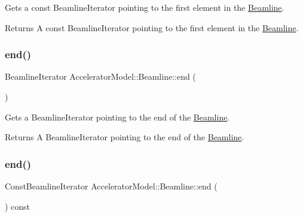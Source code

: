 Gets a const Beamline\+Iterator pointing to the first element in the \hyperlink{classAcceleratorModel_1_1Beamline}{Beamline}. \begin{DoxyReturn}{Returns}
A const Beamline\+Iterator pointing to the first element in the \hyperlink{classAcceleratorModel_1_1Beamline}{Beamline}. 
\end{DoxyReturn}
\mbox{\label{classAcceleratorModel_1_1Beamline_a190fe2e2aeca28999af7b07beea84d60}} 
\subsubsection{\texorpdfstring{end()}{end()}\hspace{0.1cm}{\footnotesize\ttfamily [1/2]}}
{\footnotesize\ttfamily Beamline\+Iterator Accelerator\+Model\+::\+Beamline\+::end (\begin{DoxyParamCaption}{ }\end{DoxyParamCaption})\hspace{0.3cm}{\ttfamily [inline]}}

Gets a Beamline\+Iterator pointing to the end of the \hyperlink{classAcceleratorModel_1_1Beamline}{Beamline}. \begin{DoxyReturn}{Returns}
A Beamline\+Iterator pointing to the end of the \hyperlink{classAcceleratorModel_1_1Beamline}{Beamline}. 
\end{DoxyReturn}
\mbox{\label{classAcceleratorModel_1_1Beamline_af0f0f0244723579b42b2e893a2273ea4}} 
\subsubsection{\texorpdfstring{end()}{end()}\hspace{0.1cm}{\footnotesize\ttfamily [2/2]}}
{\footnotesize\ttfamily Const\+Beamline\+Iterator Accelerator\+Model\+::\+Beamline\+::end (\begin{DoxyParamCaption}{ }\end{DoxyParamCaption}) const\hspace{0.3cm}{\ttfamily [inline]}}

